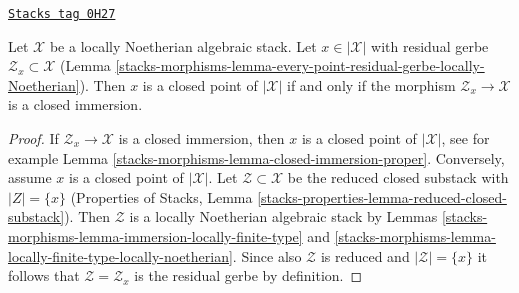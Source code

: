 \begin{lemma}
\label{stacks-morphisms-lemma-residual-space-closed}
\href{https://stacks.math.columbia.edu/tag/0H27}{\texttt{Stacks tag 0H27}}

Let $\mathcal{X}$ be a locally Noetherian algebraic stack.
Let $x \in |\mathcal{X}|$ with residual gerbe
$\mathcal{Z}_x \subset \mathcal{X}$
(Lemma \ref{stacks-morphisms-lemma-every-point-residual-gerbe-locally-Noetherian}).
Then $x$ is a closed point of $|\mathcal{X}|$ if and only if
the morphism $\mathcal{Z}_x \to \mathcal{X}$ is a closed immersion.
\end{lemma}

\begin{proof}
If $\mathcal{Z}_x \to \mathcal{X}$ is a closed immersion, then
$x$ is a closed point of $|\mathcal{X}|$, see for example
Lemma \ref{stacks-morphisms-lemma-closed-immersion-proper}.
Conversely, assume $x$ is a closed point of $|\mathcal{X}|$.
Let $\mathcal{Z} \subset \mathcal{X}$
be the reduced closed substack with $|Z| = \{x\}$
(Properties of Stacks,
Lemma \ref{stacks-properties-lemma-reduced-closed-substack}).
Then $\mathcal{Z}$ is a locally Noetherian algebraic stack
by Lemmas \ref{stacks-morphisms-lemma-immersion-locally-finite-type} and
\ref{stacks-morphisms-lemma-locally-finite-type-locally-noetherian}.
Since also $\mathcal{Z}$ is reduced and $|\mathcal{Z}| = \{x\}$
it follows that $\mathcal{Z} = \mathcal{Z}_x$ is the
residual gerbe by definition.
\end{proof}




